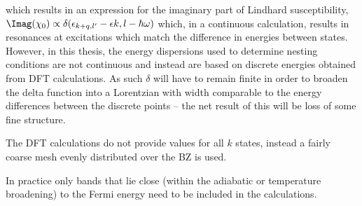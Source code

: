  which results in an expression for the imaginary part of Lindhard susceptibility, $\Imag(\chi_0)\propto \delta(\epsilon_{k+q,l^\prime} - \epsilon{k,l} - \hbar\omega)$ which, in a continuous calculation, results in resonances at excitations which match the difference in energies between states. However, in this thesis, the energy dispersions used to determine nesting conditions are not continuous and instead are based on discrete energies obtained from DFT calculations. As such $\delta$ will have to remain finite in order to broaden the delta function into a Lorentzian with width comparable to the energy differences between the discrete points -- the net result of this will be loss of some fine structure.

The DFT calculations do not provide values for all $k$ states, instead a fairly coarse mesh evenly distributed over the \ac{BZ} is used. 

In practice only bands that lie close (within the adiabatic or temperature broadening) to the Fermi energy need to be included in the calculations.
